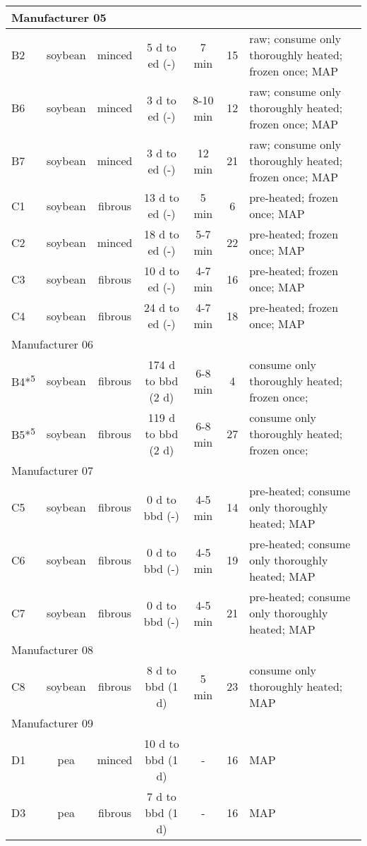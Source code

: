 \begin{longtable}{lcccccl}
\multicolumn{7}{l}{Manufacturer 05} \\ 
\midrule
B2 & soybean & minced & 5 d to ed (-) & 7 min & 15 & raw; consume only thoroughly heated; frozen once; MAP \\ 
B6 & soybean & minced & 3 d to ed (-) & 8-10 min & 12 & raw; consume only thoroughly heated; frozen once; MAP \\ 
B7 & soybean & minced & 3 d to ed (-) & 12 min & 21 & raw; consume only thoroughly heated; frozen once; MAP \\ 
C1 & soybean & fibrous & 13 d to ed (-) & 5 min & 6 & pre-heated; frozen once; MAP \\ 
C2 & soybean & minced & 18 d to ed (-) & 5-7 min & 22 & pre-heated; frozen once; MAP \\ 
C3 & soybean & fibrous & 10 d to ed (-) & 4-7 min & 16 & pre-heated; frozen once; MAP \\ 
C4 & soybean & fibrous & 24 d to ed (-) & 4-7 min & 18 & pre-heated; frozen once; MAP \\ 
\midrule
\multicolumn{7}{l}{Manufacturer 06} \\ 
\midrule
B4*\textsuperscript{5} & soybean & fibrous & 174 d to bbd (2 d) & 6-8 min & 4 & consume only thoroughly heated; frozen once;  \\ 
B5*\textsuperscript{5} & soybean & fibrous & 119 d to bbd (2 d) & 6-8 min & 27 & consume only thoroughly heated; frozen once;  \\ 
\midrule
\multicolumn{7}{l}{Manufacturer 07} \\ 
\midrule
C5 & soybean & fibrous & 0 d to bbd (-) & 4-5 min & 14 & pre-heated; consume only thoroughly heated; MAP \\ 
C6 & soybean & fibrous & 0 d to bbd (-) & 4-5 min & 19 & pre-heated; consume only thoroughly heated; MAP \\ 
C7 & soybean & fibrous & 0 d to bbd (-) & 4-5 min & 21 & pre-heated; consume only thoroughly heated; MAP \\ 
\midrule
\multicolumn{7}{l}{Manufacturer 08} \\ 
\midrule
C8 & soybean & fibrous & 8 d to bbd (1 d) & 5 min & 23 & consume only thoroughly heated; MAP \\ 
\midrule
\multicolumn{7}{l}{Manufacturer 09} \\ 
\midrule
D1 & pea & minced & 10 d to bbd (1 d) & - & 16 & MAP \\ 
D3 & pea & fibrous & 7 d to bbd (1 d) & - & 16 & MAP \\ 
\bottomrule
\end{longtable}
